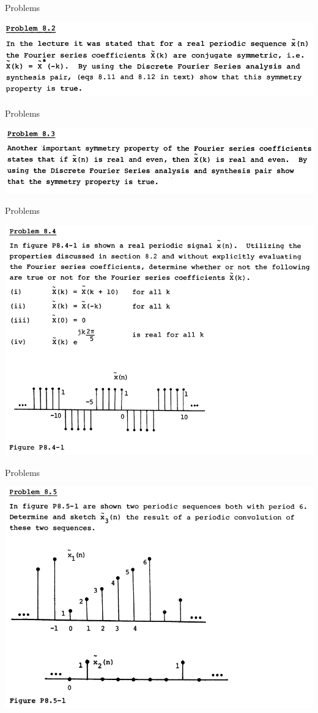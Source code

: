 \documentclass[pdflatex,compress,mathserif]{beamer}
\begin{document}
\begin{frame}{Problems}
	\begin{center}
		\includegraphics[width=\linewidth]{img/img06}
	\end{center}
\end{frame}

\begin{frame}{Problems}
	\begin{center}
		\includegraphics[width=\linewidth]{img/img07}
	\end{center}
\end{frame}

\begin{frame}{Problems}
	\begin{center}
		\includegraphics[width=0.9\linewidth]{img/img08}
	\end{center}
\end{frame}

\begin{frame}{Problems}
	\begin{center}
		\includegraphics[width=0.9\linewidth]{img/img09}
	\end{center}
\end{frame}
\end{document}
